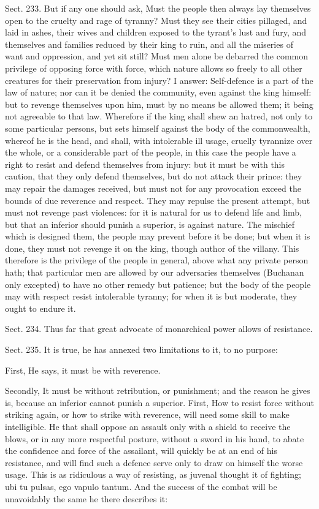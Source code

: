 \documentclass[11pt,openany]{book}
\begin{document}
Sect. 233. But if any one should ask, Must the people then always lay themselves open to the cruelty and rage of tyranny? Must they see their cities pillaged, and laid in ashes, their wives and children exposed to the tyrant's lust and fury, and themselves and families reduced by their king to ruin, and all the miseries of want and oppression, and yet sit still? Must men alone be debarred the common privilege of opposing force with force, which nature allows so freely to all other creatures for their preservation from injury? I answer: Self-defence is a part of the law of nature; nor can it be denied the community, even against the king himself: but to revenge themselves upon him, must by no means be allowed them; it being not agreeable to that law. Wherefore if the king shall shew an hatred, not only to some particular persons, but sets himself against the body of the commonwealth, whereof he is the head, and shall, with intolerable ill usage, cruelly tyrannize over the whole, or a considerable part of the people, in this case the people have a right to resist and defend themselves from injury: but it must be with this caution, that they only defend themselves, but do not attack their prince: they may repair the damages received, but must not for any provocation exceed the bounds of due reverence and respect. They may repulse the present attempt, but must not revenge past violences: for it is natural for us to defend life and limb, but that an inferior should punish a superior, is against nature. The mischief which is designed them, the people may prevent before it be done; but when it is done, they must not revenge it on the king, though author of the villany. This therefore is the privilege of the people in general, above what any private person hath; that particular men are allowed by our adversaries themselves (Buchanan only excepted) to have no other remedy but patience; but the body of the people may with respect resist intolerable tyranny; for when it is but moderate, they ought to endure it.

Sect. 234. Thus far that great advocate of monarchical power allows of resistance.

Sect. 235. It is true, he has annexed two limitations to it, to no purpose:

First, He says, it must be with reverence.

Secondly, It must be without retribution, or punishment; and the reason he gives is, because an inferior cannot punish a superior. First, How to resist force without striking again, or how to strike with reverence, will need some skill to make intelligible. He that shall oppose an assault only with a shield to receive the blows, or in any more respectful posture, without a sword in his hand, to abate the confidence and force of the assailant, will quickly be at an end of his resistance, and will find such a defence serve only to draw on himself the worse usage. This is as ridiculous a way of resisting, as juvenal thought it of fighting; ubi tu pulsas, ego vapulo tantum. And the success of the combat will be unavoidably the same he there describes it:
\end{document}
